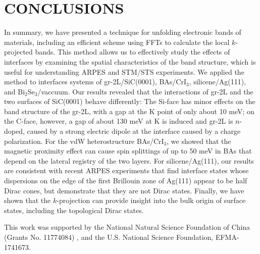 \documentclass[aps,prb,showpacs,twocolumn,reprint,superscriptaddress]{revtex4-1}
\begin{document}
\section{CONCLUSIONS}
In summary, we have presented a technique for unfolding electronic bands of materials, including
an efficient scheme using FFTs to calculate the local $k$-projected bands.
This method allows us to effectively study the effects of interfaces by 
examining the spatial characteristics of the band structure,
which is useful for understanding ARPES and STM/STS experiments.
We applied the method to interfaces systems of gr-2L/SiC(0001), BAs/CrI$_3$, silicene/Ag(111), and
Bi$_2$Se$_3$/vaccuum. 
Our results revealed that the interactions of gr-2L and the two surfaces of SiC(0001) behave differently:
The Si-face has minor effects on the band structure of the gr-2L, with a gap at the K point of only about 10
meV; on the C-face, however, a gap of about 130 meV at K is induced and gr-2L is $n$-doped, caused
by a strong electric dipole at the interface caused by a charge polarization.
For the vdW heterostructure BAs/CrI$_3$, we showed that the magnetic proximity effect can cause spin splittings of
up to 50 meV  in BAs that depend on the lateral registry of the two layers.
For silicene/Ag(111), our results are consistent with recent ARPES experiments that find interface states whose
dispersions on the edge of the first Brillouin zone of Ag(111) appear to be half Dirac cones,
but demonstrate that they are not Dirac states. Finally, we have shown that the $k$-projection can provide
insight into the bulk origin of surface states, including the topological Dirac states.

\begin{acknowledgments}
This work was supported by the National Natural Science Foundation of China (Grants No. 11774084) ,
and the U.S. National Science Foundation, EFMA-1741673.
\end {acknowledgments}



\end{document}
